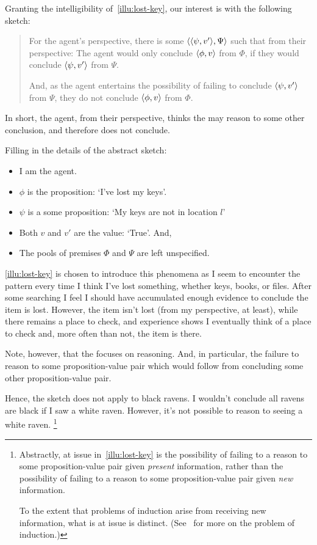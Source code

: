 \begin{note}
  Granting the intelligibility of~\autoref{illu:lost-key}, our interest is with the following sketch:
  \begin{quote}
    For the agent's perspective, there is some \(\langle \langle \psi, v' \rangle, \Psi \rangle\) such that from their perspective:
    The agent would only conclude \(\langle \phi, v \rangle\) from \(\Phi\), if they would conclude \(\langle \psi, v' \rangle\) from \(\Psi\).

    And, as the agent entertains the possibility of failing to conclude \(\langle \psi, v' \rangle\) from \(\Psi\), they do not conclude \(\langle \phi, v \rangle\) from \(\Phi\).
  \end{quote}

  In short, the agent, from their perspective, thinks the may reason to some other conclusion, and therefore does not conclude.

  Filling in the details of the abstract sketch:
  \begin{itemize}[noitemsep]
  \item
    I am the agent.
  \item
    \(\phi\) is the proposition: `I've lost my keys'.
  \item
    \(\psi\) is a some proposition: `My keys are not in location \(l\)'
  \item
    Both \(v\) and \(v'\) are the value: `True'.
    And,
  \item
    The pools of premises \(\Phi\) and \(\Psi\) are left unspecified.
  \end{itemize}

  \autoref{illu:lost-key} is chosen to introduce this phenomena as I seem to encounter the pattern every time I think I've lost something, whether keys, books, or files.
  After some searching I feel I should have accumulated enough evidence to conclude the item is lost.
  However, the item isn't lost (from my perspective, at least), while there remains a place to check, and experience shows I eventually think of a place to check and, more often than not, the item is there.
\end{note}

\begin{note}
  Note, however, that the \scen{} focuses on reasoning.
  And, in particular, the failure to reason to some proposition-value pair which would follow from concluding some other proposition-value pair.

  Hence, the sketch does not apply to black ravens.
  I wouldn't conclude all ravens are black if I saw a white raven.
  However, it's not possible to reason to seeing a white raven.%
  \footnote{
    Abstractly, at issue in~\autoref{illu:lost-key} is the possibility of failing to a reason to some proposition-value pair given \emph{present} information, rather than the possibility of failing to a reason to some proposition-value pair given \emph{new} information.

    To the extent that problems of induction arise from receiving new information, what is at issue is distinct.
    (See~\textcite{Henderson:2020wb} for more on the problem of induction.)
  }
\end{note}

